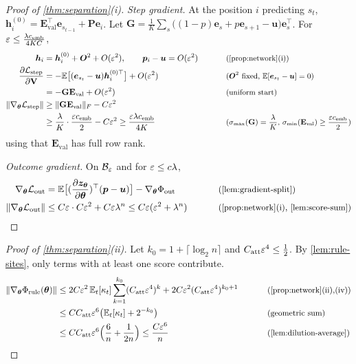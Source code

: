 \begin{proof}[Proof of \cref{thm:separation}(i)]
\emph{Step gradient.} At the position $i$ predicting $s_t$, $\bm h^{(0)}_i=\mathbf E_{\mathrm{val}}^\top\bm e_{s_{t-1}}+\mathbf P\bm e_i$. Let
$\mathbf G=\frac{1}{K}\sum_{s}\bigl((1-p)\bm e_s+p\bm e_{s+1}-\bm u\bigr)\bm e_s^\top$. For $\varepsilon\le\frac{\lambda c_{\mathrm{emb}}}{4KC}$,
\begin{alignat*}{2}
 \bm h_i&=\bm h^{(0)}_i+\bm O^2+O(\initscale^2),\qquad \bm p_i-\bm u=O(\initscale^2) &\qquad& \why{\cref{prop:network}(i)}\\
 \pd{\Lstep}{\mathbf V}&=-\E\bigl[(\bm e_{s_t}-\bm u)\bm h^{(0)\top}_i\bigr]+O(\initscale^2) && \why{$\bm O^2$ fixed, $\E[\bm e_{s_t}-\bm u]=0$}\\
 &=-\mathbf G\mathbf E_{\mathrm{val}}+O(\initscale^2) && \why{uniform start}\\
 \|\nabla_{\bm\theta}\Lstep\|&\ge\|\mathbf G\mathbf E_{\mathrm{val}}\|_F-C\initscale^2 && \\
 &\ge\frac{\mixrate}{K}\cdot\frac{\initscale\embconst}{2}-C\initscale^2\ge\frac{\initscale\mixrate\embconst}{4K} && \why{$\sigma_{\max}(\mathbf G)=\tfrac{\mixrate}{K}$, $\sigma_{\min}(\mathbf E_{\mathrm{val}})\ge\tfrac{\initscale\embconst}{2}$}
\end{alignat*}
using that $\mathbf E_{\mathrm{val}}$ has full row rank.

\emph{Outcome gradient.} On $\mathcal B_{\varepsilon}$ and for $\varepsilon\le c\lambda$,
\begin{alignat}{2}
 \nabla_{\bm\theta}\Lout&=\E\bigl[(\Jz)^\top(\bm p-\bm u)\bigr]-\nabla_{\bm\theta}\outcredit &\qquad& \why{\cref{lem:gradient-split}}\nonumber\\
 \|\nabla_{\bm\theta}\Lout\|&\le C\initscale\cdot C\initscale^2+C\initscale\mixrate^n\le C\initscale(\initscale^2+\mixrate^n) && \why{\cref{prop:network}(i), \cref{lem:score-sum}}\label{eq:outcome-grad}
\end{alignat}
\end{proof}

\begin{proof}[Proof of \cref{thm:separation}(ii)]
Let $k_0=1+\lceil\log_2n\rceil$ and $C_{\mathrm{att}}\varepsilon^4\le\frac{1}{2}$. By \cref{lem:rule-sites}, only terms with at least one score contribute.
\begin{alignat*}{2}
 \|\nabla_{\bm\theta}\rulecredit(\bm\theta)\|
 &\le2C\initscale^2\,\E_t[\kappa_t]\sum_{k=1}^{k_0}(\attconst\initscale^4)^k+2C\initscale^2(\attconst\initscale^4)^{k_0+1} &\qquad& \why{\cref{prop:network}(ii),(iv)}\\
 &\le C\attconst\initscale^6\bigl(\E_t[\kappa_t]+2^{-k_0}\bigr) && \why{geometric sum}\\
 &\le C\attconst\initscale^6\Bigl(\frac{6}{n}+\frac{1}{2n}\Bigr)\le\frac{C\initscale^6}{n} && \why{\cref{lem:dilution-average}}\qedhere
\end{alignat*}
\end{proof}

